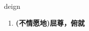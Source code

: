 
\begin{frame}
{\huge deign}
\begin{center}
\begin{enumerate}\Large
  \item \textbf{(不情愿地)屈尊，俯就}
\end{enumerate}
\end{center}
\end{frame}
